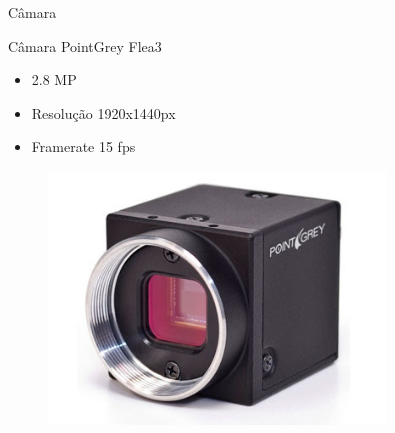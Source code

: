 \begin{frame}{Câmara}
    
    \begin{minipage}{0.6\textwidth}
        
        Câmara PointGrey Flea3

        \begin{itemize}
            \item 2.8 MP
            \item Resolução 1920x1440px
            \item Framerate 15 fps
        \end{itemize}

    \end{minipage}%
    \begin{minipage}{0.4\textwidth}
        \begin{figure}
            \centering
            \includegraphics[width=0.8\textwidth]{img/flea3.jpg}
        \end{figure}
    \end{minipage}

\end{frame}

